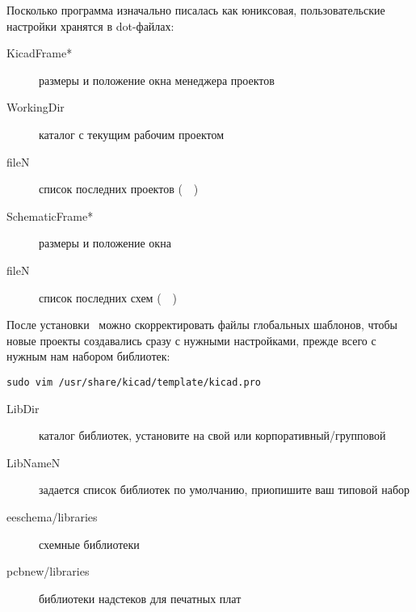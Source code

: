 
Посколько программа изначально писалась как юниксовая, пользовательские
настройки хранятся в dot-файлах:


\begin{description}
\item[KicadFrame*] размеры и положение окна менеджера проектов
\item[WorkingDir] каталог с текущим рабочим проектом
\item[fileN] список последних проектов (\ \ )
\end{description}


\begin{description}
\item[SchematicFrame*] размеры и положение окна 
\item[fileN] список последних схем (\ \ )
\end{description}


После установки \kicad\ можно скорректировать файлы глобальных шаблонов, чтобы
новые проекты создавались сразу с нужными настройками, прежде всего с нужным
нам набором библиотек:

\begin{verbatim}
sudo vim /usr/share/kicad/template/kicad.pro
\end{verbatim}


\begin{description}
\item[LibDir] каталог библиотек, установите на свой или корпоративный/групповой
\item[LibNameN] задается список библиотек по умолчанию, приопишите ваш типовой
набор
\item[eeschema/libraries] схемные библиотеки \eeschema
\item[pcbnew/libraries] библиотеки надстеков для печатных плат \pcbnew
\end{description}

\secup
